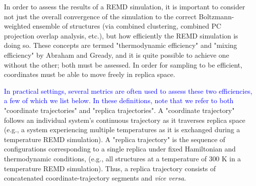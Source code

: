 In order to assess the results of a REMD simulation, it is important to consider not just the overall convergence of the simulation to the correct Boltzmann-weighted ensemble of structures (via combined clustering, combined PC projection overlap analysis, etc.), but how efficiently the REMD simulation is doing so. These concepts are termed "thermodynamic efficiency" and "mixing efficiency" by Abraham and Gready,\citep{Abraham2008} and it is quite possible to achieve one without the other; both must be assessed. In order for sampling to be efficient, coordinates must be able to move freely in replica space.

\textcolor{blue}{In practical settings, several metrics are often used to assess these two efficiencies, a few of which we list below.  In these definitions, note that we refer to both} "coordinate trajectories" and "replica trajectories". A "coordinate trajectory" follows an individual system's continuous trajectory as it traverses replica space (e.g., a system experiencing multiple temperatures as it is exchanged during a temperature REMD simulation). A "replica trajectory" is the sequence of configurations corresponding to a single replica under fixed Hamiltonian and thermodynamic conditions, (e.g., all structures at a temperature of 300 K in a temperature REMD simulation).  Thus, a replica trajectory consists of concatenated coordinate-trajectory segments and \textit{vice versa}.

